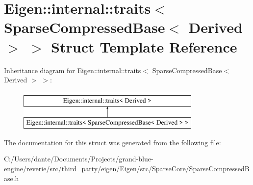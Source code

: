\hypertarget{struct_eigen_1_1internal_1_1traits_3_01_sparse_compressed_base_3_01_derived_01_4_01_4}{}\section{Eigen\+::internal\+::traits$<$ Sparse\+Compressed\+Base$<$ Derived $>$ $>$ Struct Template Reference}
\label{struct_eigen_1_1internal_1_1traits_3_01_sparse_compressed_base_3_01_derived_01_4_01_4}
Inheritance diagram for Eigen\+::internal\+::traits$<$ Sparse\+Compressed\+Base$<$ Derived $>$ $>$\+:\begin{figure}[H]
\begin{center}
\leavevmode
\includegraphics[height=2.000000cm]{struct_eigen_1_1internal_1_1traits_3_01_sparse_compressed_base_3_01_derived_01_4_01_4}
\end{center}
\end{figure}


The documentation for this struct was generated from the following file\+:\begin{DoxyCompactItemize}
\item 
C\+:/\+Users/dante/\+Documents/\+Projects/grand-\/blue-\/engine/reverie/src/third\+\_\+party/eigen/\+Eigen/src/\+Sparse\+Core/Sparse\+Compressed\+Base.\+h\end{DoxyCompactItemize}
